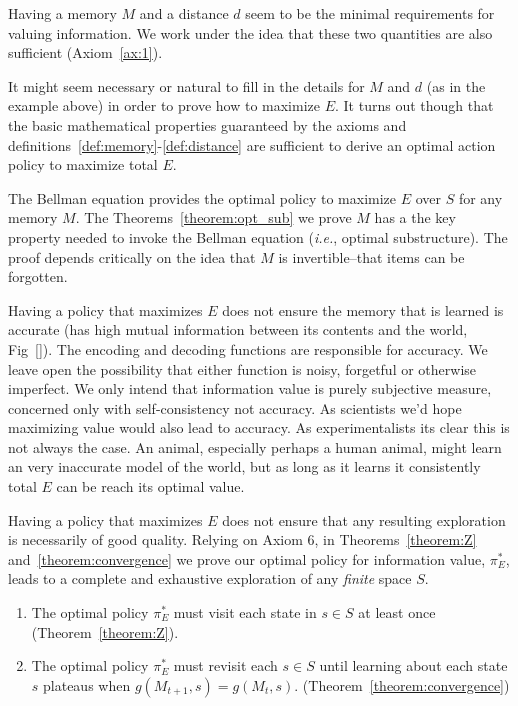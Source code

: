 \documentclass[9pt,twocolumn,twoside]{pnas-new}
\begin{document}
Having a memory $M$ and a distance $d$ seem to be the minimal requirements for valuing information. We work under the idea that these two quantities are also  sufficient (Axiom~\ref{ax:1}).

It might seem necessary or natural to fill in the details for $M$ and $d$ (as in the example above) in order to prove how to maximize $E$. It turns out though that the basic mathematical properties guaranteed by the axioms and definitions~\ref{def:memory}-\ref{def:distance} are sufficient to derive an optimal action policy to maximize total $E$. 

The Bellman equation provides the optimal policy to maximize $E$ over $S$ for any memory $M$. The Theorems~\ref{theorem:opt_sub} we prove $M$ has a the key property needed to invoke the Bellman equation (\textit{i.e.}, optimal substructure). The proof depends critically on the idea that $M$ is invertible--that items can be forgotten. 


Having a policy that maximizes $E$ does not ensure the memory that is learned is accurate (has high mutual information between its contents and the world, Fig~\ref{}). The encoding and decoding functions are responsible for accuracy. We leave open the possibility that either function is noisy, forgetful or otherwise imperfect. We only intend that information value is purely subjective measure, concerned only with self-consistency not accuracy. As scientists we'd hope maximizing value would also lead to accuracy. As experimentalists its clear this is not always the case. An animal, especially perhaps a human animal, might learn an very inaccurate model of the world, but as long as it learns it consistently total $E$ can be reach its optimal value.

Having a policy that maximizes $E$ does not ensure that any resulting exploration is necessarily of good quality. Relying on Axiom 6, in Theorems~\ref{theorem:Z} and~\ref{theorem:convergence} we prove our optimal policy for information value, $\pi^*_E$, leads to a complete and exhaustive exploration of any \textit{finite} space $S$.

\begin{enumerate}[noitemsep,wide=0pt,leftmargin=\dimexpr\labelwidth+2\labelsep\relax]
    \item The optimal policy $\pi^*_E$ must visit each state in $s \in S$ at least once (Theorem~\ref{theorem:Z}).
    \item The optimal policy $\pi^*_E$ must revisit each $s \in S$ until learning about each state $s$ plateaus when $g(M_{t+1}, s) = g(M_{t},s)$. (Theorem~\ref{theorem:convergence})
\end{enumerate}
\end{document}
